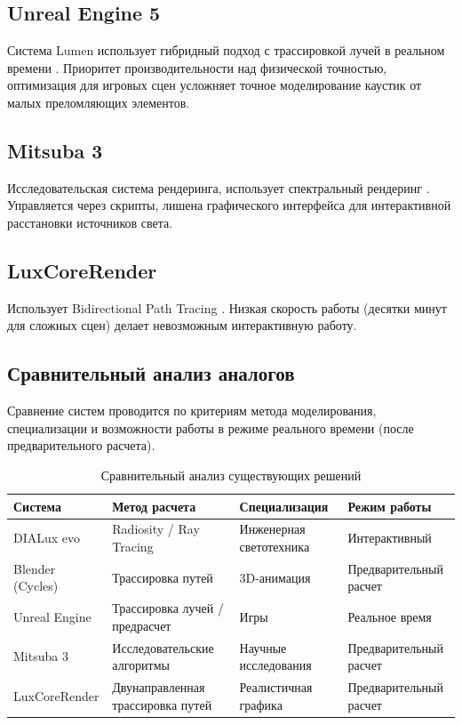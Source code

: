 \subsection{Unreal Engine 5}

Система Lumen использует гибридный подход с трассировкой лучей в реальном времени \cite{8}. Приоритет производительности над физической точностью, оптимизация для игровых сцен усложняет точное моделирование каустик от малых преломляющих элементов.

\subsection{Mitsuba 3}

Исследовательская система рендеринга, использует спектральный рендеринг \cite{9}. Управляется через скрипты, лишена графического интерфейса для интерактивной расстановки источников света.

\subsection{LuxCoreRender}

Использует Bidirectional Path Tracing \cite{10}. Низкая скорость работы (десятки минут для сложных сцен) делает невозможным интерактивную работу.

\subsection{Сравнительный анализ аналогов}

Сравнение систем проводится по критериям метода моделирования, специализации и возможности работы в режиме реального времени (после предварительного расчета).

\begin{table}[H]
\centering
\caption{Сравнительный анализ существующих решений}
\label{tab:comparison}
\begin{tabularx}{\textwidth}{|X|X|X|X|}
\hline
\textbf{Система} & \textbf{Метод расчета} & \textbf{Специализация} & \textbf{Режим работы} \\
\hline
DIALux evo & Radiosity / Ray Tracing & Инженерная светотехника & Интерактивный \\
\hline
Blender (Cycles) & Трассировка путей & 3D-анимация & Предварительный расчет \\
\hline
Unreal Engine & Трассировка лучей / предрасчет & Игры & Реальное время \\
\hline
Mitsuba 3 & Исследовательские алгоритмы & Научные исследования & Предварительный расчет \\
\hline
LuxCoreRender & Двунаправленная трассировка путей & Реалистичная графика & Предварительный расчет \\
\hline
\end{tabularx}
\end{table}

